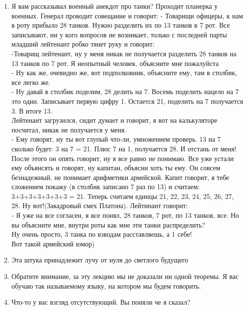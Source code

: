 \begin{enumerate}
    \item Я вам рассказывал военный анекдот про танки?
    Проходит планерка у военных. Генерал проводит совещание и говорит:
    - Товарищи офицеры, к нам в роту прибыло 28 танков. Нужно разделить их по 13 танков в 7 рот.
    Все записывают, ни у кого вопросов не возникает, только с последней парты младший лейтенант робко тянет руку и говорит:\\
    -Товарищ лейтенант, ну у меня никак не получается разделить 28 танков на 13 танков по 7 рот. Я неопытный человек, объясните мне пожалуйста\\
    - Ну как же, очевидно же, вот подполковник, объясните ему, там в столбик, все легко же. \\
    - Ну давай в столбик поделим, 28 делить на 7. Восемь поделить нацело на 7 это один. Записывает первую цифру 1. Остается 21, поделить на 7 получается 3. В итоге 13. \\
    Лейтенант загрузился, сидит думает и говорит, я вот на калькуляторе посчитал, никак не получается у меня. \\
    - Ему говорят, ну ты вот глупый что-ли, умножением проверь. 13 на 7 сколько будет: 3 на 7 = 21. Плюс 7 на 1, получается 28. И отстань от меня!\\

    После этого он опять говорит, ну я все равно не понимаю. Все уже устали ему объянсять и говорят, ну капитан, объясни хоть ты ему. Он совсем безнадежный, не понимает арифметики армейской. Капит говорит, я тебе сложением покажу (в столбик записано 7 раз по 13) и считаем: 3+3+3+3+3+3+3 = 21. Теперь считаем единцы 21, 22, 23, 24, 25, 26, 27, 28. Ну вот!(Закадровый смех Платона). Лейтинант говорит:\\
    - Я уже на все согласен, я все понял, 28 танков, 7 рот, по 13 танков, все. Но вы объясните мне, внутри роты как мне эти танки распределить? \\

    Ну очень просто, 3 танка по взводам расставляешь, а 1 себе!\\
    Вот такой армейский юмор)
    

    \item Эта штука принадлежит лучу от нуля до светлого будущего

    \item Обратите внимание, за эту лекцию мы не доказали ни одной теоремы. Я вас обучаю так называемому языку, на котором мы будем говорить.

    \item Что-то у вас взгляд отсутствующий. Вы поняли че я сказал?


\end{enumerate}

